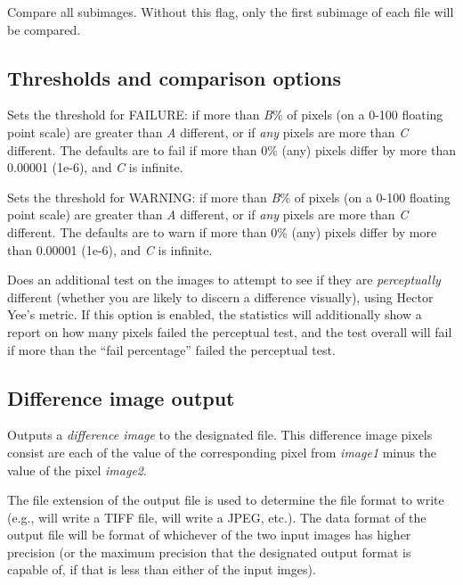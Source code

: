Compare all subimages.  Without this flag, only the first subimage
of each file will be compared.
\apiend


\subsection*{Thresholds and comparison options}


Sets the threshold for {\cf FAILURE}: if more than \emph{B}\% of pixels
(on a 0-100 floating point scale) are greater than \emph{A} different,
or if \emph{any} pixels are more than \emph{C} different.  The defaults
are to fail if more than 0\% (any) pixels differ by more than 0.00001
(1e-6), and \emph{C} is infinite.
\apiend


Sets the threshold for {\cf WARNING}: if more than \emph{B}\% of pixels
(on a 0-100 floating point scale) are greater than \emph{A} different,
or if \emph{any} pixels are more than \emph{C} different.  The defaults
are to warn if more than 0\% (any) pixels differ by more than 0.00001
(1e-6), and \emph{C} is infinite.
\apiend

Does an additional test on the images to attempt to see if they are
\emph{perceptually} different (whether you are likely to discern
a difference visually), using Hector Yee's metric.  If this option
is enabled, the statistics will additionally show a report on how
many pixels failed the perceptual test, and the test overall will
fail if more than the ``fail percentage'' failed the perceptual test.
\apiend

\subsection*{Difference image output}

Outputs a \emph{difference image} to the designated file.
This difference image pixels consist are each of the value of the
corresponding pixel from \emph{image1} minus the value of the
pixel \emph{image2}.  

The file extension of the output file is used to determine the file
format to write (e.g.,  will write a TIFF file,
 will write a JPEG, etc.).  The data format of the output
file will be format of whichever of the two input images has higher
precision (or the maximum precision that the designated output format is
capable of, if that is less than either of the input imges).

